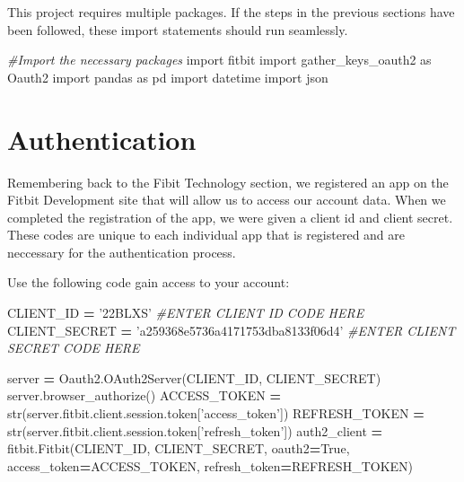 \documentclass[]{book}
\newenvironment{Shaded}{\begin{snugshade}}{\end{snugshade}}
\newcommand{\StringTok}[1]{\textcolor[rgb]{0.31,0.60,0.02}{#1}}
\newcommand{\ImportTok}[1]{#1}
\newcommand{\CommentTok}[1]{\textcolor[rgb]{0.56,0.35,0.01}{\textit{#1}}}
\newcommand{\VariableTok}[1]{\textcolor[rgb]{0.00,0.00,0.00}{#1}}
\newcommand{\OperatorTok}[1]{\textcolor[rgb]{0.81,0.36,0.00}{\textbf{#1}}}
\newcommand{\BuiltInTok}[1]{#1}
\newcommand{\NormalTok}[1]{#1}
\begin{document}
This project requires multiple packages. If the steps in the previous
sections have been followed, these import statements should run
seamlessly.

\begin{Shaded}
\begin{Highlighting}[]
\CommentTok{#Import the necessary packages}
\ImportTok{import}\NormalTok{ fitbit}
\ImportTok{import}\NormalTok{ gather_keys_oauth2 }\ImportTok{as}\NormalTok{ Oauth2}
\ImportTok{import}\NormalTok{ pandas }\ImportTok{as}\NormalTok{ pd }
\ImportTok{import}\NormalTok{ datetime}
\ImportTok{import}\NormalTok{ json}
\end{Highlighting}
\end{Shaded}

\section{Authentication}\label{authentication}

Remembering back to the Fibit Technology section, we registered an app
on the Fitbit Development site that will allow us to access our account
data. When we completed the registration of the app, we were given a
client id and client secret. These codes are unique to each individual
app that is registered and are neccessary for the authentication
process.

Use the following code gain access to your account:

\begin{Shaded}
\begin{Highlighting}[]
\NormalTok{CLIENT_ID }\OperatorTok{=} \StringTok{'22BLXS'} \CommentTok{#ENTER CLIENT ID CODE HERE }
\NormalTok{CLIENT_SECRET }\OperatorTok{=} \StringTok{'a259368e5736a4171753dba8133f06d4'} \CommentTok{#ENTER CLIENT SECRET CODE HERE}

\NormalTok{server }\OperatorTok{=}\NormalTok{ Oauth2.OAuth2Server(CLIENT_ID, CLIENT_SECRET)}
\NormalTok{server.browser_authorize()}
\NormalTok{ACCESS_TOKEN }\OperatorTok{=} \BuiltInTok{str}\NormalTok{(server.fitbit.client.session.token[}\StringTok{'access_token'}\NormalTok{])}
\NormalTok{REFRESH_TOKEN }\OperatorTok{=} \BuiltInTok{str}\NormalTok{(server.fitbit.client.session.token[}\StringTok{'refresh_token'}\NormalTok{])}
\NormalTok{auth2_client }\OperatorTok{=}\NormalTok{ fitbit.Fitbit(CLIENT_ID, CLIENT_SECRET, oauth2}\OperatorTok{=}\VariableTok{True}\NormalTok{, access_token}\OperatorTok{=}\NormalTok{ACCESS_TOKEN,}
\NormalTok{refresh_token}\OperatorTok{=}\NormalTok{REFRESH_TOKEN)}
\end{Highlighting}
\end{Shaded}
\end{document}
